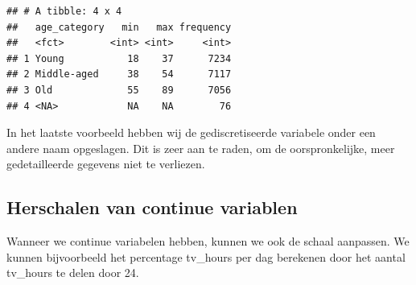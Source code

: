 \documentclass[]{tufte-book}
\newenvironment{Shaded}{}{}
\newcommand{\DataTypeTok}[1]{\textcolor[rgb]{0.56,0.13,0.00}{#1}}
\newcommand{\DecValTok}[1]{\textcolor[rgb]{0.25,0.63,0.44}{#1}}
\newcommand{\KeywordTok}[1]{\textcolor[rgb]{0.00,0.44,0.13}{\textbf{#1}}}
\newcommand{\NormalTok}[1]{#1}
\newcommand{\OperatorTok}[1]{\textcolor[rgb]{0.40,0.40,0.40}{#1}}
\newcommand{\StringTok}[1]{\textcolor[rgb]{0.25,0.44,0.63}{#1}}
\begin{document}
\begin{verbatim}
## # A tibble: 4 x 4
##   age_category   min   max frequency
##   <fct>        <int> <int>     <int>
## 1 Young           18    37      7234
## 2 Middle-aged     38    54      7117
## 3 Old             55    89      7056
## 4 <NA>            NA    NA        76
\end{verbatim}

In het laatste voorbeeld hebben wij de gediscretiseerde variabele onder een andere naam opgeslagen. Dit is zeer aan te raden, om de oorspronkelijke, meer gedetailleerde gegevens niet te verliezen.

\hypertarget{herschalen-van-continue-variablen}{%
\subsection{Herschalen van continue variablen}\label{herschalen-van-continue-variablen}}

Wanneer we continue variabelen hebben, kunnen we ook de schaal aanpassen. We kunnen bijvoorbeeld het percentage tv\_hours per dag berekenen door het aantal tv\_hours te delen door 24.

\begin{Shaded}
\end{Shaded}
\end{document}
